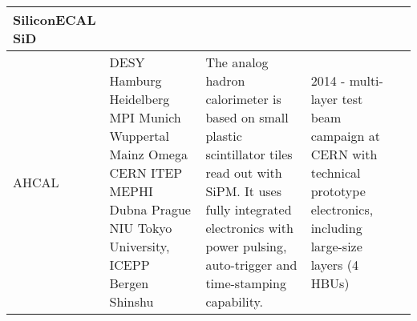 \begin{landscape}
\begin{table}[h]
\begin{adjustbox}{max width=1\textwidth}
\begin{tabularx}{2\textwidth}{lXXXX}
    \midrule
    SiliconECAL SiD                                                                                                &                                                                                                                                         &                                                                                                                                                                                                                                                                                                                                                                                      &                                                                                                                                                                                                                                                                 &                                                                                                                                                                                                                                     \\
    \midrule
    AHCAL &
    DESY\newline
    Hamburg\newline
    Heidelberg\newline
    MPI Munich \newline
    Wuppertal\newline
    Mainz\newline
    Omega\newline
    CERN\newline
    ITEP\newline
    MEPHI\newline
    Dubna\newline
    Prague\newline
    NIU\newline
    Tokyo University, ICEPP\newline
    Bergen\newline
    Shinshu &
     The analog hadron calorimeter is based on small plastic scintillator tiles read out with SiPM. It uses fully integrated electronics with power pulsing, auto-trigger and time-stamping capability.                                                                                                                                                                                   &
     2014 - multi-layer test beam campaign at CERN with technical prototype electronics, including large-size layers (4 HBUs)\newline

\end{tabularx}
\end{adjustbox}
\end{table}
\end{landscape}
